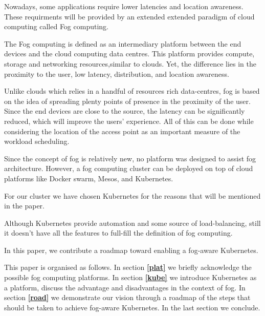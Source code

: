 \documentclass[letterpaper,twocolumn,10pt]{article}
\let\origref\ref
\def\ref#1{\textbf{\origref{#1}}}
\begin{document}

Nowadays, some applications require lower latencies and location awareness. These requirments will be provided by an extended extended paradigm of cloud computing called Fog computing\cite{bonomi2011connected,Bonomi:2012:FCR:2342509.2342513}.

The Fog computing is defined as an intermediary platform between the end devices and the cloud computing data centres. This platform provides compute, storage and networking resources,similar to clouds. Yet, the difference lies in the proximity to the user, low latency, distribution, and location awareness. 

Unlike clouds which relies in a handful of resources rich data-centres, fog is based on the idea of spreading plenty points of presence in the proximity of the user. Since the end devices are close to the source, the latency can be significantly reduced, which will improve the users' experience. All of this can be done while considering the location of the access point as an important measure of the workload scheduling.

Since the concept of fog is relatively new, no platform was designed to assist fog architecture. However, a fog computing cluster can be deployed on top of cloud platforms like Docker swarm, Mesos, and Kubernetes.

For our cluster we have chosen Kubernetes for the reasons that will be mentioned in the paper.

Although Kubernetes provide automation and some source of load-balancing, still it doesn't have all the features to full-fill the definition of fog computing.    

In this paper, we contribute a roadmap toward enabling a fog-aware Kubernetes.


This paper is organised as follows. In section \ref{plat} we briefly acknowledge the possible fog computing platforms. In section \ref{kube} we introduce Kubernetes as a platform, discuss the advantage and disadvantages in the context of fog. In section 
\ref{road} we demonstrate our vision through a roadmap of the steps that should be taken to achieve fog-aware Kubernetes. In the last section we conclude. 
\end{document}
